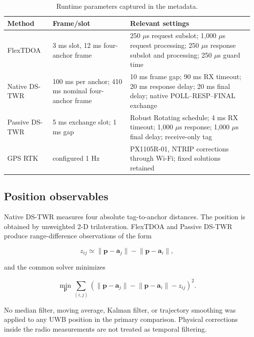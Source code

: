 \documentclass[11pt,a4paper]{article}
\newcommand{\native}{\textcolor{nativeblue}{Native DS-TWR}}
\newcommand{\passive}{\textcolor{passivepurple}{Passive DS-TWR}}
\newcommand{\flex}{\textcolor{flexorange}{FlexTDOA}}
\newcommand{\rtk}{\textcolor{rtkgreen}{GPS RTK}}
\begin{document}
\begin{table}[H]
  \centering
  \caption{Runtime parameters captured in the metadata.}
  \small
  \begin{tabularx}{\textwidth}{p{34mm}p{31mm}Y}
    \toprule
    Method & Frame/slot & Relevant settings\\
    \midrule
    \flex{} & 3 ms slot, 12 ms four-anchor frame
      & 250 $\mu$s request subslot; 1,000 $\mu$s request processing;
        250 $\mu$s response subslot and processing; 250 $\mu$s guard time\\
    \native{} & 100 ms per anchor; 410 ms nominal four-anchor frame
      & 10 ms frame gap; 90 ms RX timeout; 20 ms response delay;
        20 ms final delay; native POLL--RESP--FINAL exchange\\
    \passive{} & 5 ms exchange slot; 1 ms gap
      & Robust Rotating schedule; 4 ms RX timeout; 1,000 $\mu$s response;
        1,000 $\mu$s final delay; receive-only tag\\
    \rtk{} & configured 1 Hz
      & PX1105R-01, NTRIP corrections through Wi-Fi; fixed solutions retained\\
    \bottomrule
  \end{tabularx}
\end{table}

\subsection{Position observables}

Native DS-TWR measures four absolute tag-to-anchor distances. The position is
obtained by unweighted 2-D trilateration. FlexTDOA and Passive DS-TWR produce
range-difference observations of the form

\begin{equation}
 z_{ij} \simeq \lVert\mathbf p-\mathbf a_j\rVert
             -\lVert\mathbf p-\mathbf a_i\rVert,
\end{equation}

and the common solver minimizes

\begin{equation}
 \min_{\mathbf p}\sum_{(i,j)}
 \left(\lVert\mathbf p-\mathbf a_j\rVert
 -\lVert\mathbf p-\mathbf a_i\rVert-z_{ij}\right)^2.
\end{equation}

No median filter, moving average, Kalman filter, or trajectory smoothing was
applied to any UWB position in the primary comparison. Physical corrections
inside the radio measurements are not treated as temporal filtering.
\end{document}
